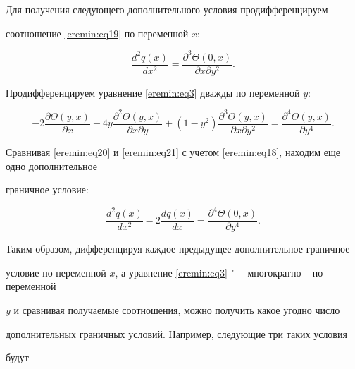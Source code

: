 Для получения следующего дополнительного условия продифференцируем

соотношение \eqref{eremin:eq19} по переменной $x$:

\begin{equation}

\label{eremin:eq20}

\frac{d^2q(x)}{dx^2}=\frac{\partial^3\Theta (0,  x)}{\partial x\partial

y^2}.

\end{equation}

Продифференцируем уравнение \eqref{eremin:eq3} дважды по переменной $y$:

\begin{equation}

\label{eremin:eq21}

-2\frac{\partial \Theta (y,x)}{\partial x}-4y\frac{\partial^2\Theta

(y,x)}{\partial x\partial y}+(1-y^2)\frac{\partial^3\Theta

(y,x)}{\partial x\partial y^2}=\frac{\partial^4\Theta (y,x)}{\partial

y^4}.

\end{equation}

Сравнивая \eqref{eremin:eq20} и \eqref{eremin:eq21} с учетом \eqref{eremin:eq18}, находим еще одно дополнительное

граничное условие:

\begin{equation}

\label{eremin:eq22}

\frac{d^2q(x)}{dx^2}-2\frac{dq(x)}{dx}=\frac{\partial^4 \Theta

(0,  x)}{\partial y^4}.

\end{equation}



Таким образом, дифференцируя каждое предыдущее дополнительное граничное

условие по переменной $x$, а уравнение \eqref{eremin:eq3} "--- многократно -- по переменной

$y$ и сравнивая получаемые соотношения, можно получить какое угодно число

дополнительных граничных условий. Например, следующие три таких условия

будут

